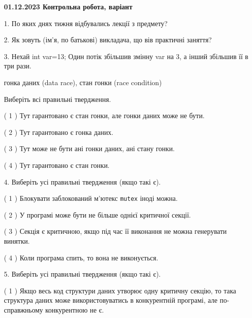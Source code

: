 \documentclass[12pt, ukrainian]{article}
\def\code#1{\Verb!#1!}
\begin{document}
\vspace{4mm}
\newpage
\begin {large}

\textbf{01.12.2023 Контрольна робота, варіант  }\par


{
1. По яких днях тижня відбувались лекції з предмету?



\vspace{5mm}
2. Як зовуть (ім'я, по батькові) викладача, що вів практичні заняття?



\vspace{5mm}
3. Нехай int var=13; Один потік збільшив змінну var на 3, а інший збільшив її в три рази.

гонка даних (data race), стан гонки (race condition)

Виберіть всі правильні твердження.\par
\vspace{2mm}
( 1 ) Тут гарантовано є стан гонки, але гонки даних може не бути.%

( 2 ) Тут гарантовано є гонка даних.%

( 3 ) Тут може не бути ані гонки даних, ані стану гонки.%

( 4 ) Тут гарантовано є стан гонки.%


\vspace{5mm}
4. Виберіть усі правильні твердження (якщо такі є).\par
\vspace{2mm}

( 1 ) Блокувати заблокований м’ютекс  \code{mutex} іноді можна.%

( 2 ) У програмі може бути не більше однієї критичної секції.%

( 3 ) Секція є критичною, якщо під час її виконання не можна генерувати винятки.%

( 4 ) Коли програма спить, то вона не виконується.%


\vspace{5mm}
5. Виберіть усі правильні твердження (якщо такі є).\par
\vspace{2mm}

( 1 ) Якщо весь код структури даних утворює одну критичну секцію, то така структура даних може використовуватись в конкурентній програмі, але по-справжньо\-му конкурентною не є.%

}
\end{large}
\end{document}
